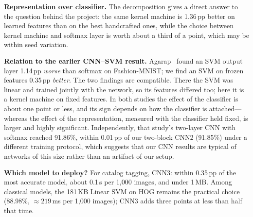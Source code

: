 \documentclass[conference]{IEEEtran}
\newcommand{\pp}{\,pp}                       %
\begin{document}
\textbf{Representation over classifier.} The decomposition gives a direct answer to the question behind the project:
the same kernel machine is 1.36\pp{} better on learned features than on the best handcrafted ones, while the choice
between kernel machine and softmax layer is worth about a third of a point, which may be within seed variation.

\textbf{Relation to the earlier CNN--SVM result.} Agarap~\cite{agarap2017cnnsvm} found an SVM output layer
1.14\pp{} \emph{worse} than softmax on Fashion-MNIST; we find an SVM on frozen features 0.35\pp{} \emph{better}. The two
findings are compatible. There the SVM was linear and trained jointly with the network, so its features differed too;
here it is a kernel machine on fixed features. In both studies the effect of the classifier is about one point or less,
and its sign depends on how the classifier is attached---whereas the effect of the representation, measured with the
classifier held fixed, is larger and highly significant. Independently, that study's two-layer CNN with softmax reached
91.86\%, within 0.01\pp{} of our two-block CNN2 (91.85\%) under a different training protocol, which suggests that our
CNN results are typical of networks of this size rather than an artifact of our setup.

\textbf{Which model to deploy?} For catalog tagging, CNN3: within 0.35\pp{} of the most accurate model, about 0.1\,s per
1{,}000 images, and under 1\,MB. Among classical models, the 181\,KB Linear SVM on HOG remains the practical choice
(88.98\%, ${\approx}219$\,ms per 1{,}000 images); CNN3 adds three points at less than half that time.
\end{document}
